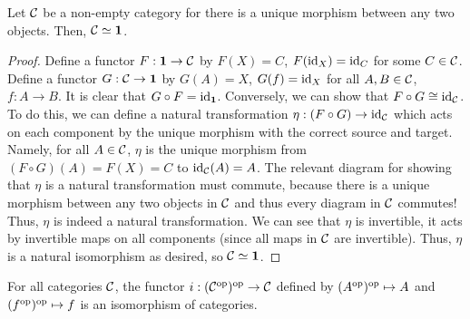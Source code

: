 \begin{prop}\label{unique-morphism-contractible} Let ${\mathcal C}$ be a non-empty category for there is a unique morphism between any two objects. Then, ${\mathcal C}\simeq {\bf 1}$.
\end{prop}
\begin{proof}
Define a functor $F:{\bf 1}\to {\mathcal C}$ by $F(X)=C$, $F(\operatorname{id}_X)=\operatorname{id}_C$ for some $C\in {\mathcal C}$. Define a functor $G:{\mathcal C}\to{\bf 1}$ by $G(A)=X$, $G(f)=\operatorname{id}_X$ for all $A,B\in {\mathcal C}$, $f:A\to B$. It is clear that $G\circ F=\operatorname{id}_{\bf 1}$. Conversely, we can show that $F\circ G\cong \operatorname{id}_{{\mathcal C}}$. To do this, we can define a natural transformation $\eta:(F\circ G)\to \operatorname{id}_{{\mathcal C}}$ which acts on each component by the unique morphism with the correct source and target. Namely, for all $A\in {\mathcal C}$, $\eta$ is the unique morphism from $(F\circ G)(A)=F(X)=C$ to $\operatorname{id}_{{\mathcal C}}(A)=A$. The relevant diagram for showing that $\eta$ is a natural transformation must commute, because there is a unique morphism between any two objects in ${\mathcal C}$ and thus every diagram in ${\mathcal C}$ commutes! Thus, $\eta$ is indeed a natural transformation. We can see that $\eta$ is invertible, it acts by invertible maps on all components (since all maps in ${\mathcal C}$ are invertible). Thus, $\eta$ is a natural isomorphism as desired, so ${\mathcal C}\simeq {\bf 1}$.
\end{proof}

\begin{ex} For all categories ${\mathcal C}$, the functor $i:({\mathcal C}^{\operatorname{op}})^{\operatorname{op}}\to {\mathcal C}$ defined by $(A^{\operatorname{op}})^{\operatorname{op}}\mapsto A$ and $(f^{\operatorname{op}})^{\operatorname{op}}\mapsto f$ is an isomorphism of categories.
\end{ex}

